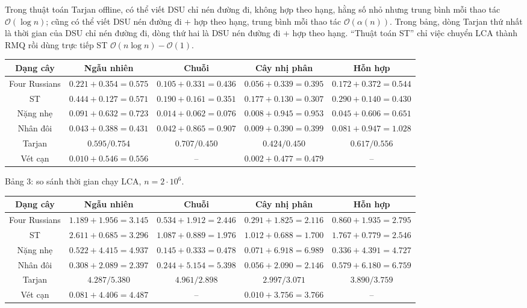 \documentclass[11pt]{article}
\newcommand{\Oh}{\mathcal{O}}
\begin{document}
Trong thuật toán Tarjan offline, có thể viết DSU chỉ nén đường đi, không hợp
theo hạng, hằng số nhỏ nhưng trung bình mỗi thao tác \(\Oh(\log n)\); cũng có
thể viết DSU nén đường đi + hợp theo hạng, trung bình mỗi thao tác
\(\Oh(\alpha(n))\). Trong bảng, dòng Tarjan thứ nhất là thời gian của DSU chỉ
nén đường đi, dòng thứ hai là DSU nén đường đi + hợp theo hạng. ``Thuật toán
ST'' chỉ việc chuyển LCA thành RMQ rồi dùng trực tiếp ST
\(\Oh(n\log n)-\Oh(1)\).

\begin{center}
\scriptsize
\begin{tabular}{c c c c c}
\textbf{Dạng cây} & \textbf{Ngẫu nhiên} & \textbf{Chuỗi} &
\textbf{Cây nhị phân} & \textbf{Hỗn hợp}\\
\hline
Four Russians & \(0.221+0.354=0.575\) & \(0.105+0.331=0.436\) &
\(0.056+0.339=0.395\) & \(0.172+0.372=0.544\)\\
ST & \(0.444+0.127=0.571\) & \(0.190+0.161=0.351\) &
\(0.177+0.130=0.307\) & \(0.290+0.140=0.430\)\\
Nặng nhẹ & \(0.091+0.632=0.723\) & \(0.014+0.062=0.076\) &
\(0.008+0.945=0.953\) & \(0.045+0.606=0.651\)\\
Nhân đôi & \(0.043+0.388=0.431\) & \(0.042+0.865=0.907\) &
\(0.009+0.390=0.399\) & \(0.081+0.947=1.028\)\\
Tarjan & \(0.595/0.754\) & \(0.707/0.450\) &
\(0.424/0.450\) & \(0.617/0.556\)\\
Vét cạn & \(0.010+0.546=0.556\) & -- &
\(0.002+0.477=0.479\) & --
\end{tabular}
\end{center}

\begin{center}
\small Bảng 3: so sánh thời gian chạy LCA, \(n=2\cdot 10^6\).
\end{center}

\begin{center}
\scriptsize
\begin{tabular}{c c c c c}
\textbf{Dạng cây} & \textbf{Ngẫu nhiên} & \textbf{Chuỗi} &
\textbf{Cây nhị phân} & \textbf{Hỗn hợp}\\
\hline
Four Russians & \(1.189+1.956=3.145\) & \(0.534+1.912=2.446\) &
\(0.291+1.825=2.116\) & \(0.860+1.935=2.795\)\\
ST & \(2.611+0.685=3.296\) & \(1.087+0.889=1.976\) &
\(1.012+0.688=1.700\) & \(1.767+0.779=2.546\)\\
Nặng nhẹ & \(0.522+4.415=4.937\) & \(0.145+0.333=0.478\) &
\(0.071+6.918=6.989\) & \(0.336+4.391=4.727\)\\
Nhân đôi & \(0.308+2.089=2.397\) & \(0.244+5.154=5.398\) &
\(0.056+2.090=2.146\) & \(0.579+6.180=6.759\)\\
Tarjan & \(4.287/5.380\) & \(4.961/2.898\) &
\(2.997/3.071\) & \(3.890/3.759\)\\
Vét cạn & \(0.081+4.406=4.487\) & -- &
\(0.010+3.756=3.766\) & --
\end{tabular}
\end{center}
\end{document}
